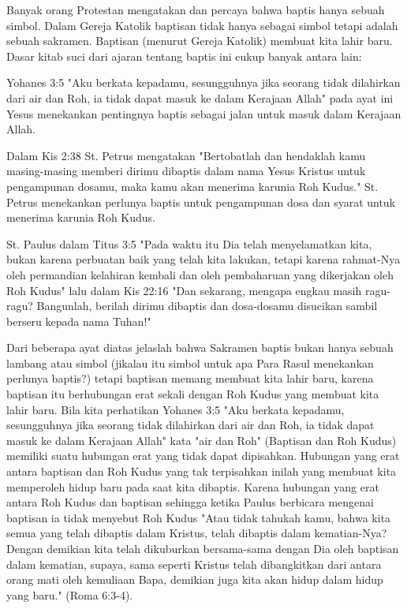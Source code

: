 
Banyak orang Protestan mengatakan dan percaya bahwa baptis hanya sebuah simbol. Dalam Gereja Katolik baptisan tidak hanya sebagai simbol tetapi adalah sebuah sakramen. Baptisan (menurut Gereja Katolik) membuat kita lahir baru. Dasar kitab suci dari ajaran tentang baptis ini cukup banyak antara lain:

Yohanes 3:5 "Aku berkata kepadamu, sesungguhnya jika seorang tidak dilahirkan dari air dan Roh, ia tidak dapat masuk ke dalam Kerajaan Allah" pada ayat ini Yesus menekankan pentingnya baptis sebagai jalan untuk masuk dalam Kerajaan Allah.

Dalam Kis 2:38 St. Petrus mengatakan "Bertobatlah dan hendaklah kamu masing-masing memberi dirimu dibaptis dalam nama Yesus Kristus untuk pengampunan dosamu, maka kamu akan menerima karunia Roh Kudus." St. Petrus menekankan perlunya baptis untuk pengampunan dosa dan syarat untuk menerima karunia Roh Kudus.

St. Paulus dalam Titus 3:5 "Pada waktu itu Dia telah menyelamatkan kita, bukan karena perbuatan baik yang telah kita lakukan, tetapi karena rahmat-Nya oleh permandian kelahiran kembali dan oleh pembaharuan yang dikerjakan oleh Roh Kudus" lalu dalam Kis 22:16 "Dan sekarang, mengapa engkau masih ragu-ragu? Bangunlah, berilah dirimu dibaptis dan dosa-dosamu disucikan sambil berseru kepada nama Tuhan!"

Dari beberapa ayat diatas jelaslah bahwa Sakramen baptis bukan hanya sebuah lambang atau simbol (jikalau itu simbol untuk apa Para Rasul menekankan perlunya baptis?) tetapi baptisan memang membuat kita lahir baru, karena baptisan itu berhubungan erat sekali dengan Roh Kudus yang membuat kita lahir baru. Bila kita perhatikan Yohanes 3:5 "Aku berkata kepadamu, sesungguhnya jika seorang tidak dilahirkan dari air dan Roh, ia tidak dapat masuk ke dalam Kerajaan Allah" kata "air dan Roh" (Baptisan dan Roh Kudus) memiliki suatu hubungan erat yang tidak dapat dipisahkan. Hubungan yang erat antara baptisan dan Roh Kudus yang tak terpisahkan inilah yang membuat kita memperoleh hidup baru pada saat kita dibaptis. Karena hubungan yang erat antara Roh Kudus dan baptisan sehingga ketika Paulus berbicara mengenai baptisan ia tidak menyebut Roh Kudus "Atau tidak tahukah kamu, bahwa kita semua yang telah dibaptis dalam Kristus, telah dibaptis dalam kematian-Nya? Dengan demikian kita telah dikuburkan bersama-sama dengan Dia oleh baptisan dalam kematian, supaya, sama seperti Kristus telah dibangkitkan dari antara orang mati oleh kemuliaan Bapa, demikian juga kita akan hidup dalam hidup yang baru." (Roma 6:3-4).

